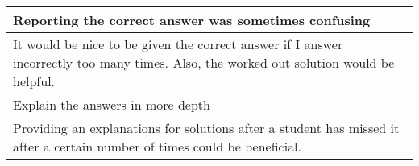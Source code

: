 \begin{longtable}{|p{1\linewidth}|}
		\hline
		Reporting the correct answer was sometimes confusing                                                                                                                                                                                                                                                                                                                                                                                                                                                                                                                                                                                                                                             \\
		\hline
		It would be nice to be given the correct answer if I answer incorrectly too many times. Also, the worked out solution would be helpful.                                                                                                                                                                                                                                                                                                                                                                                                                                                                                                                                                          \\
		\hline
		Explain the answers in more depth                                                                                                                                                                                                                                                                                                                                                                                                                                                                                                                                                                                                                                                                \\
		\hline
		Providing an explanations for solutions after a student has missed it after a certain number of times could be beneficial.                                                                                                                                                                                                                                                                                                                                                                                                                                                                                                                                                                       \\

\end{longtable}
